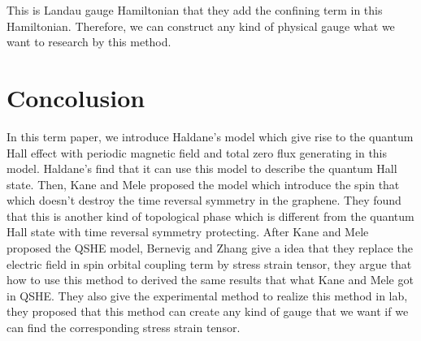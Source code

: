 \documentclass[12pt,a4paper]{article}
\begin{document}
\noindent
This is Landau gauge Hamiltonian that they add the confining term in this
Hamiltonian. Therefore, we can construct any kind of physical gauge what we
want to research by this method. 


\section*{Concolusion}

In this term paper, we introduce Haldane's model which give rise to the
quantum Hall effect with periodic magnetic field and total zero flux
generating in this model. Haldane's find that it can use this model to
describe the quantum Hall state. Then, Kane and Mele proposed the model
which introduce the spin that which doesn't destroy the time reversal
symmetry in the graphene. They found that this is another kind of
topological phase which is different from the quantum Hall state with time
reversal symmetry protecting. After Kane and Mele proposed the QSHE model,
Bernevig and Zhang give a idea that they replace the electric field in spin
orbital coupling term by stress strain tensor, they argue that how to use
this method to derived the same results that what Kane and Mele got in
QSHE\@. They also give the experimental method to realize this method in
lab, they proposed that this method can create any kind of gauge that we
want if we can find the corresponding stress strain tensor.



\end{document}
